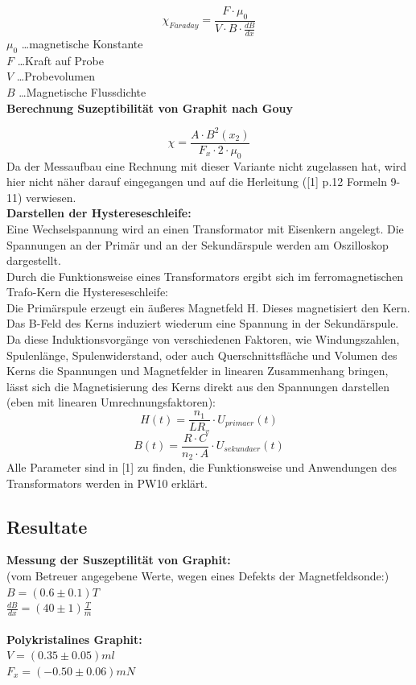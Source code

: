 \documentclass[12pt,a4paper]{article}
\begin{document}
\begin{multicols}{2}
$$\chi_{Faraday} = \frac{F \cdot \mu_0}{V \cdot B \cdot \frac{dB}{dx}}$$
$\mu_0$ \ldots magnetische Konstante\\
$F$ \ldots Kraft auf Probe\\
$V$ \ldots Probevolumen\\
$B$ \ldots Magnetische Flussdichte\\

\noindent \textbf{Berechnung Suzeptibilität von Graphit nach Gouy}

$$\chi = \frac{A \cdot B^2(x_2)}{F_x \cdot 2 \cdot \mu_{0}} $$
Da der Messaufbau eine Rechnung mit dieser Variante nicht zugelassen hat, wird hier nicht näher darauf eingegangen und auf die Herleitung ([1] p.12 Formeln 9-11) verwiesen.\\

\noindent \textbf{Darstellen der Hystereseschleife:}\\
Eine Wechselspannung wird an einen Transformator mit Eisenkern angelegt. Die Spannungen an der Primär und an der Sekundärspule werden am Oszilloskop dargestellt.\\
Durch die Funktionsweise eines Transformators ergibt sich im ferromagnetischen Trafo-Kern die Hystereseschleife:\\
Die Primärspule erzeugt ein äußeres Magnetfeld H. Dieses magnetisiert den Kern. Das B-Feld des Kerns induziert wiederum eine Spannung in der Sekundärspule.\\
Da diese Induktionsvorgänge von verschiedenen Faktoren, wie Windungszahlen, Spulenlänge, Spulenwiderstand, oder auch Querschnittsfläche und Volumen des Kerns die Spannungen und Magnetfelder in linearen Zusammenhang bringen, lässt sich die Magnetisierung des Kerns direkt aus den Spannungen darstellen (eben mit linearen Umrechnungsfaktoren):
$$H(t) = \frac{n_1}{L R_v}\cdot U_{primaer}(t)$$
$$B(t)= \frac{R\cdot C}{n_2 \cdot A} \cdot U_{sekundaer}(t)$$
Alle Parameter sind in [1] zu finden, die Funktionsweise und Anwendungen des Transformators werden in PW10 erklärt.
\pagebreak
\subsection{Resultate}
\textbf{Messung der Suszeptilität von Graphit:}\\
(vom Betreuer angegebene Werte, wegen eines Defekts der Magnetfeldsonde:)\\
$B = (0.6 \pm 0.1)T$\\
$\frac{dB}{dx} = (40 \pm 1) \frac{T}{m}$\\
\\
\textbf{Polykristalines Graphit:}\\
$V=(0.35 \pm 0.05) ml$\\
$F_x=(-0.50 \pm 0.06)mN$


\end{multicols}
\end{document}
